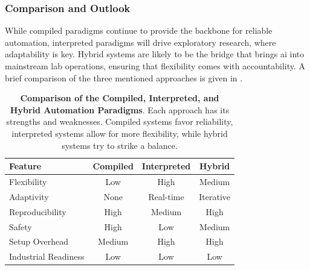 \subsubsection{Comparison and Outlook}
While compiled paradigms continue to provide the backbone for reliable automation, interpreted paradigms will drive exploratory research, where adaptability is key. 
Hybrid systems are likely to be the bridge that brings \gls{ai} into mainstream lab operations, ensuring that flexibility comes with accountability. A brief comparison of the three mentioned approaches is given in .

\begin{table}[ht]
\centering
\caption{\textbf{Comparison of the Compiled, Interpreted, and Hybrid Automation Paradigms}. Each approach has its strengths and weaknesses. Compiled systems favor reliability, interpreted systems allow for more flexibility, while hybrid systems try to strike a balance. }
\begin{tabular}{lccc}
\toprule
\textbf{Feature} & \textbf{Compiled} & \textbf{Interpreted} & \textbf{Hybrid} \\
\midrule
Flexibility & \textcolor{NegativeColor}{Low} & \textcolor{PositiveColor}{High} & Medium \\
Adaptivity & \textcolor{NegativeColor}{None} & \textcolor{PositiveColor}{Real-time} & Iterative \\
Reproducibility & \textcolor{PositiveColor}{High} & Medium & \textcolor{PositiveColor}{High} \\
Safety & \textcolor{PositiveColor}{High} & \textcolor{NegativeColor}{Low} & Medium \\
Setup Overhead & Medium & \textcolor{NegativeColor}{High} & \textcolor{NegativeColor}{High} \\
Industrial Readiness & \textcolor{NegativeColor}{Low} & \textcolor{NegativeColor}{Low} & \textcolor{NegativeColor}{Low} \\
\bottomrule
\end{tabular}
\label{tab:execution_comparison}
\end{table}

